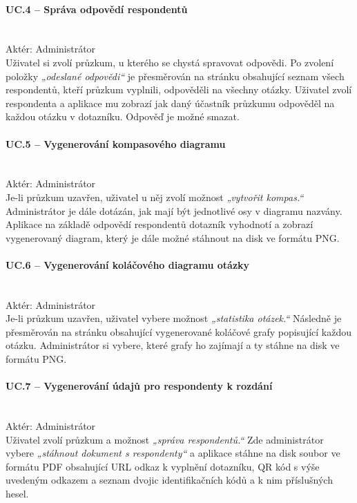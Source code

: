 \paragraph{UC.4 – Správa odpovědí respondentů}~\\
Aktér: Administrátor~\\
Uživatel si zvolí průzkum, u kterého se chystá spravovat odpovědi. Po zvolení položky \textit{„odeslané odpovědi“} je přesměrován na stránku obsahující seznam všech respondentů, kteří průzkum vyplnili, odpověděli na všechny otázky. Uživatel zvolí respondenta a aplikace mu zobrazí jak daný účastník průzkumu odpověděl na každou otázku v dotazníku. Odpověď je možné smazat.

\paragraph{UC.5 – Vygenerování kompasového diagramu}~\\
Aktér: Administrátor~\\
Je-li průzkum uzavřen, uživatel u něj zvolí možnost \textit{„vytvořit kompas.“} Administrátor je dále dotázán, jak mají být jednotlivé osy v diagramu nazvány. Aplikace na základě odpovědí respondentů dotazník vyhodnotí a zobrazí vygenerovaný diagram, který je dále možné stáhnout na disk ve formátu PNG.

\paragraph{UC.6 – Vygenerování koláčového diagramu otázky}~\\
Aktér: Administrátor~\\
Je-li průzkum uzavřen, uživatel vybere možnost \textit{„statistika otázek.“} Následně je přesměrován na stránku obsahující vygenerované koláčové grafy popisující každou otázku. Administrátor si vybere, které grafy ho zajímají a ty stáhne na disk ve formátu PNG. 

\paragraph{UC.7 – Vygenerování údajů pro respondenty k rozdání}~\\
Aktér: Administrátor~\\
Uživatel zvolí průzkum a možnost \textit{„správa respondentů.“} Zde administrátor vybere \textit{„stáhnout dokument s respondenty“} a aplikace stáhne na disk soubor ve formátu PDF obsahující URL odkaz k vyplnění dotazníku, QR kód s výše uvedeným odkazem a seznam dvojic identifikačních kódů a k nim příslušných hesel.  

